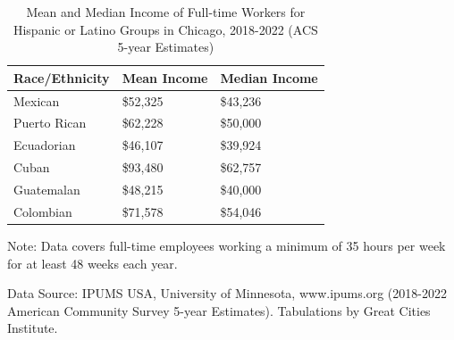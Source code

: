\documentclass[
]{article}
\begin{document}
\begin{table}[H]
\centering
\begin{threeparttable}
\caption{\label{tab:unnamed-chunk-36}Mean and Median Income of Full-time Workers for Hispanic or Latino Groups in Chicago, 2018-2022 (ACS 5-year Estimates)}
\centering
\fontsize{8}{10}\selectfont
\begin{tabular}[t]{>{\raggedright\arraybackslash}p{14.2em}>{\raggedleft\arraybackslash}p{7.9em}>{\raggedleft\arraybackslash}p{7.9em}}
\toprule
\begingroup\fontsize{8}{10}\selectfont \textbf{Race/Ethnicity}\endgroup & \begingroup\fontsize{8}{10}\selectfont \textbf{Mean Income}\endgroup & \begingroup\fontsize{8}{10}\selectfont \textbf{Median Income}\endgroup\\
\midrule
Mexican & \$52,325 & \$43,236\\
Puerto Rican & \$62,228 & \$50,000\\
Ecuadorian & \$46,107 & \$39,924\\
Cuban & \$93,480 & \$62,757\\
Guatemalan & \$48,215 & \$40,000\\
Colombian & \$71,578 & \$54,046\\
\bottomrule
\end{tabular}
\begin{tablenotes}
\small
\item [] \footnotesize{Note: Data covers full-time employees working a minimum of 35 hours per week for at least 48 weeks each year.}
\item [] \footnotesize{Data Source: IPUMS USA, University of Minnesota, www.ipums.org (2018-2022 American Community Survey 5-year Estimates). Tabulations by Great Cities Institute.}
\end{tablenotes}
\end{threeparttable}
\end{table}
\end{document}
